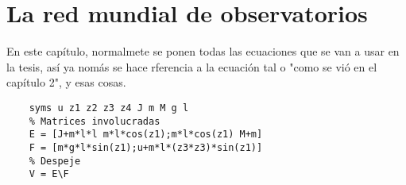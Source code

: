 

\chapter{La red mundial de observatorios}
En este capítulo, normalmete se ponen todas las ecuaciones que se van a usar en la tesis, así ya nomás se hace rferencia a la ecuación tal o "como se vió en el capítulo 2", y esas cosas.
\begin{lstlisting}[frame=single]
    % Declaracion de las variables simbolicas
    syms u z1 z2 z3 z4 J m M g l 
    % Matrices involucradas
    E = [J+m*l*l m*l*cos(z1);m*l*cos(z1) M+m] 
    F = [m*g*l*sin(z1);u+m*l*(z3*z3)*sin(z1)] 
    % Despeje
    V = E\F
\end{lstlisting}

\blindtext